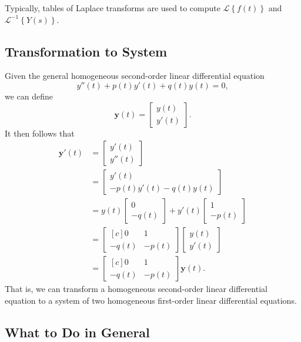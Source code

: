 \documentclass{myart}
\renewcommand{\L}[1]{\mathcal{L}\left\{#1\right\}}
\newcommand{\Li}[1]{\mathcal{L}^{-1}\left\{#1\right\}}
\renewcommand{\vec}[1]{\mathbf{#1}}
\newcommand{\Vect}[2]{\begin{bmatrix*} #1 \\ #2 \end{bmatrix*}}
\newcommand{\mat}[2][r]{\begin{bmatrix*}[#1] #2 \end{bmatrix*}}
\begin{document}
Typically, tables of Laplace transforms are used to compute $\L{f(t)}$
and $\Li{Y(s)}$.

\subsection{Transformation to System}
\label{subsec:transformation to system}

Given the general homogeneous second-order linear differential
equation
\begin{equation*}
  y''(t) + p(t) y'(t) + q(t) y(t) = 0,
\end{equation*}
we can define
\begin{equation*}
  \vec y(t) = \Vect{y(t)}{y'(t)}.
\end{equation*}
It then follows that
\begin{align*}
  \vec y'(t) &= \Vect{y'(t)}{y''(t)} \\
             &= \Vect{y'(t)}{-p(t)y'(t) - q(t)y(t)} \\
             &= y(t) \Vect{0}{-q(t)} + y'(t) \Vect{1}{-p(t)} \\
             &= \mat[c]{0 & 1 \\ -q(t) & -p(t)} \Vect{y(t)}{y'(t)} \\
             &= \mat[c]{0 & 1 \\ -q(t) & -p(t)} \vec y(t).
\end{align*}
That is, we can transform a homogeneous second-order linear
differential equation to a system of two homogeneous first-order
linear differential equations.

\subsection{What to Do in General}
\label{subsec:second order strategy}
\end{document}
